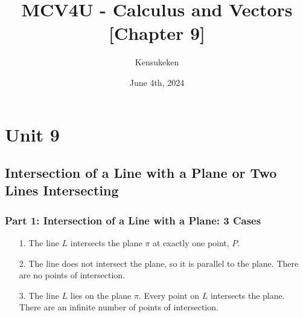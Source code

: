 \documentclass{article}
\title{MCV4U - Calculus and Vectors [Chapter 9]}
\author{Kensukeken}
\date{June 4th, 2024}
\begin{document}
\maketitle

\tableofcontents
\newpage
\section{Unit 9}
\subsection{Intersection of a Line with a Plane or Two Lines Intersecting}
\subsubsection{Part 1: Intersection of a Line with a Plane: 3 Cases}
\begin{enumerate}
    \item[1.] The line \( L \) intersects the plane \( \pi \) at exactly one point, \( P \).
    \item[2.] The line does not intersect the plane, so it is parallel to the plane. There are no points of intersection.
    \item[3.] The line \( L \) lies on the plane \( \pi \). Every point on \( L \) intersects the plane. There are an infinite number of points of intersection.
\end{enumerate}
\end{document}
